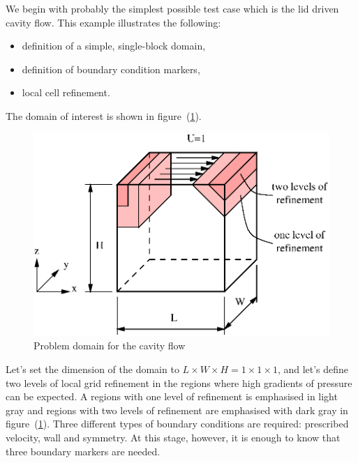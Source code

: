 \documentclass[10pt]{article}
\begin{document}
    We begin with probably the simplest possible test case
    which is the lid driven cavity flow. This example 
    illustrates the following:
    \begin{itemize}
    \item definition of a simple, single-block domain,
    \item definition of boundary condition markers,
    \item local cell refinement.  
    \end{itemize}
    The domain of interest is shown in figure~(\ref{cavity}).
    \begin{figure}
    \centering
    \includegraphics[scale=0.8]{cavity.eps}
    \caption{Problem domain for the cavity flow}
    \label{cavity}
    \end{figure}
     Let's set the dimension of the domain to 
     $L \times W \times H = 1 \times 1 \times 1$, and let's 
     define two levels of local grid refinement in the regions 
     where high gradients of pressure can be expected. A regions
     with one level of refinement is emphasised in light gray 
     and regions with two levels of
     refinement are emphasised with dark gray in figure~(\ref{cavity}).
     Three different types of boundary conditions are required:
     prescribed velocity, wall and symmetry. At this stage, however,
     it is enough to know that three boundary markers are needed. 
\end{document}
